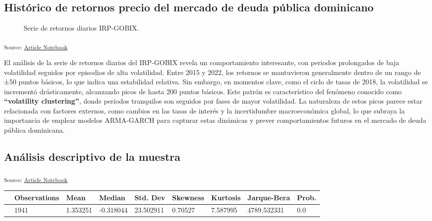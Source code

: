 \documentclass[
  number,
  preprint,
  3p,
  onecolumn]{elsarticle}
\begin{document}
\subsection{Histórico de retornos precio del mercado de deuda pública
dominicano}\label{sec-historico-retornos}

\begin{figure}[H]


\caption{\label{fig-price-return-series}Serie de retornos diarios
IRP-GOBIX.}

\end{figure}%

\textsubscript{Source:
\href{https://iancont.github.io/fixed_income_garch/index-preview.html}{Article
Notebook}}

El análisis de la serie de retornos diarios del IRP-GOBIX revela un
comportamiento interesante, con periodos prolongados de baja volatilidad
seguidos por episodios de alta volatilidad. Entre 2015 y 2022, los
retornos se mantuvieron generalmente dentro de un rango de ±50 puntos
básicos, lo que indica una estabilidad relativa. Sin embargo, en
momentos clave, como el ciclo de tasas de 2018, la volatilidad se
incrementó drásticamente, alcanzando picos de hasta 200 puntos básicos.
Este patrón es característico del fenómeno conocido como
\textbf{``volatility clustering''}, donde periodos tranquilos son
seguidos por fases de mayor volatilidad. La naturaleza de estos picos
parece estar relacionada con factores externos, como cambios en las
tasas de interés y la incertidumbre macroeconómica global, lo que
subraya la importancia de emplear modelos ARMA-GARCH para capturar estas
dinámicas y prever comportamientos futuros en el mercado de deuda
pública dominicana.

\subsection{Análisis descriptivo de la
muestra}\label{sec-estadistica-descriptiva}

\textsubscript{Source:
\href{https://iancont.github.io/fixed_income_garch/index-preview.html}{Article
Notebook}}

\begin{longtable}[]{@{}lllllllll@{}}
\toprule\noalign{}
& Observations & Mean & Median & Std. Dev & Skewness & Kurtosis &
Jarque-Bera & Prob. \\
\midrule\noalign{}
\endhead
\bottomrule\noalign{}
\endlastfoot
0 & 1941 & 1.353251 & -0.318044 & 23.502911 & 0.70527 & 7.587995 &
4789.532331 & 0.0 \\
\end{longtable}
\end{document}
